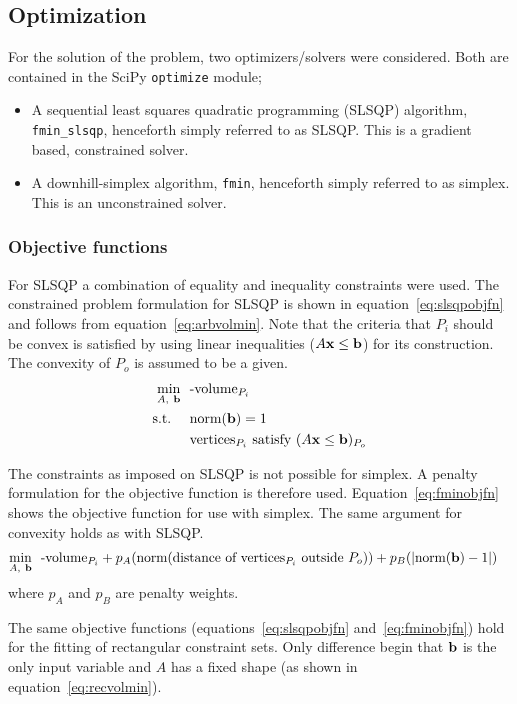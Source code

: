 \subsection{Optimization}
For the solution of the problem, two optimizers/solvers were considered.
Both are contained in the SciPy \texttt{optimize} module;
\begin{itemize}
  \item A sequential least squares quadratic programming (SLSQP) algorithm, \texttt{fmin\_slsqp}, henceforth simply referred to as SLSQP. 
This is a gradient based, constrained solver.
  \item A downhill-simplex algorithm, \texttt{fmin}, henceforth simply referred to as simplex.
This is an unconstrained solver.
\end{itemize}

\subsubsection{Objective functions}
For SLSQP a combination of equality and inequality constraints were used.
The constrained problem formulation for SLSQP is shown in equation~\ref{eq:slsqpobjfn} and follows from equation~\ref{eq:arbvolmin}.
Note that the criteria that $P_i$ should be convex is satisfied by using linear inequalities ($A{\bf {x}} \leq {\bf {b}}$) for its construction.
The convexity of $P_o$ is assumed to be a given.
\begin{align}
  \label{eq:slsqpobjfn}
    \min_{A,~{\bf {b}}}~~&\text{-volume}_{P_i}\\
    \text{s.t.}~~~~ &\text{norm}({\bf {b}}) = 1 \notag \\
                    &\text{vertices}_{P_i} \text{~satisfy~} (A{\bf {x}}\leq{\bf {b}})_{P_o} \notag  
\end{align}

The constraints as imposed on SLSQP is not possible for simplex.
A penalty formulation for the objective function is therefore used.
Equation~\ref{eq:fminobjfn} shows the objective function for use with simplex.
The same argument for convexity holds as with SLSQP.
\begin{align}
  \label{eq:fminobjfn}
    \min_{A,~{\bf {b}}}~~&\text{-volume}_{P_i} + p_A(\text{norm}(\text{distance of vertices$_{P_i}$ outside}~P_o)) + p_B(|\text{norm}({\bf {b}}) - 1|)  
\end{align}
where $p_A$ and $p_B$ are penalty weights.

The same objective functions (equations~\ref{eq:slsqpobjfn} and~\ref{eq:fminobjfn}) hold for the fitting of rectangular constraint sets.
Only difference begin that ${\bf {b}}$ is the only input variable and $A$ has a fixed shape (as shown in equation~\ref{eq:recvolmin}).

